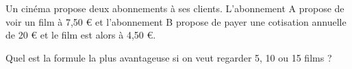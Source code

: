 
Un cinéma propose deux abonnements à ses clients. L'abonnement A propose de voir un film à 7,50 € et l'abonnement B propose de payer une cotisation annuelle de 20 € et le film est alors à 4,50 €.
 
Quel est la formule la plus avantageuse si on veut regarder 5, 10 ou 15 films ?